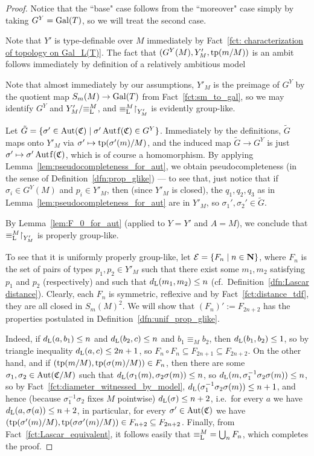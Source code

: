 	\begin{proof}
		Notice that the ``base" case follows from the ``moreover" case simply by taking $G^Y=\operatorname{{Gal}}(T)$, so we will treat the second case.
		
		Note that $Y'$ is type-definable over $M$ immediately by Fact~\ref{fct: characterization of topology on Gal_L(T)}. The fact that $(G^Y(M),Y'_M,\operatorname{{tp}}(m/M))$ is an ambit follows immediately by definition of a relatively ambitious model
		
		Note that almost immediately by our assumptions, $Y'_M$ is the preimage of $G^Y$ by the quotient map $S_m(M)\to \operatorname{{Gal}}(T)$ from Fact~\ref{fct:sm_to_gal}, so we may identify $G^Y$ and $Y'_M/{\equiv_{\mathrm{L}}^M}$, and ${\equiv_{\mathrm{L}}^M}\mathord{\upharpoonright}_{Y'_M}$ is evidently group-like.
		
		Let $\tilde G=\{\sigma'\in \Aut(\fC)\mid \sigma'\Autf(\fC)\in G^Y \} $. Immediately by the definitions, $\tilde G$ maps onto $Y'_M$ via $\sigma'\mapsto \operatorname{{tp}}(\sigma'(m)/M)$, and the induced map $\tilde G\to G^Y$ is just $\sigma'\mapsto \sigma'\Autf(\fC)$, which is of course a homomorphism. By applying Lemma~\ref{lem:pseudocompleteness_for_aut}, we obtain pseudocompleteness (in the sense of Definition~\ref{dfn:prop_glike}) --- to see that, just notice that if $\sigma_i\in G^Y(M)$ and $p_i\in Y'_M$, then (since $Y'_M$ is closed), the $q_1,q_2,q_3$ as in Lemma~\ref{lem:pseudocompleteness_for_aut} are in $Y'_M$, so $\sigma_1',\sigma_2'\in \tilde G$.
		
		By Lemma~\ref{lem:F_0_for_aut} (applied to $Y=Y'$ and $A=M$), we conclude that ${\equiv_{\mathrm{L}}^M}\mathord{\upharpoonright}_{Y'_M}$ is properly group-like.
		
		To see that it is uniformly properly group-like, let $\mathcal E=\{F_n\mid n\in{\mathbf{N}}\}$, where $F_n$ is the set of pairs of types $p_1,p_2\in Y'_M$ such that there exist some $m_1,m_2$ satisfying $p_1$ and $p_2$ (respectively) and such that $d_{\mathrm{L}}(m_1,m_2)\leq n$ (cf.\ Definition~\ref{dfn:Lascar distance}). Clearly, each $F_n$ is symmetric, reflexive and by Fact~\ref{fct:distance_tdf}, they are all closed in $S_m(M)^2$. We will show that $(F_n)':=F_{2n+2}$ has the properties postulated in Definition~\ref{dfn:unif_prop_glike}.
		
		Indeed, if $d_{\mathrm{L}}(a,b_1)\leq n$ and $d_{\mathrm{L}}(b_2,c)\leq n$ and $b_1\equiv_M b_2$, then $d_{\mathrm{L}}(b_1,b_2)\leq 1$, so by triangle inequality $d_{\mathrm{L}}(a,c)\leq 2n+1$, so $F_n\circ F_n\subseteq F_{2n+1}\subseteq F_{2n+2}$. On the other hand, and if $(\operatorname{{tp}}(m/M),\operatorname{{tp}}(\sigma(m)/M))\in F_n$, then there are some $\sigma_1,\sigma_2\in \operatorname{{Aut}}({\mathfrak C}/M)$ such that $d_{\mathrm{L}}(\sigma_1(m),\sigma_2\sigma(m))\leq n$, so $d_{\mathrm{L}}(m,\sigma_1^{-1}\sigma_2\sigma(m))\leq n$, so by Fact~\ref{fct:diameter_witnessed_by_model}, $d_{\mathrm{L}}(\sigma_1^{-1}\sigma_2\sigma(m))\leq n+1$, and hence (because $\sigma_1^{-1}\sigma_2$ fixes $M$ pointwise) $d_{\mathrm{L}}(\sigma)\leq n+2$, i.e.\ for every $a$ we have $d_{\mathrm{L}}(a,\sigma(a))\leq n+2$, in particular, for every $\sigma'\in \operatorname{{Aut}}({\mathfrak C})$ we have $(\operatorname{{tp}}(\sigma'(m)/M),\operatorname{{tp}}(\sigma\sigma'(m)/M))\in F_{n+2}\subseteq F_{2n+2}$. Finally, from Fact~\ref{fct:Lascar_equivalent}, it follows easily that ${\equiv_{\mathrm{L}}^M}=\bigcup_n F_n$, which completes the proof.
	\end{proof}
	
